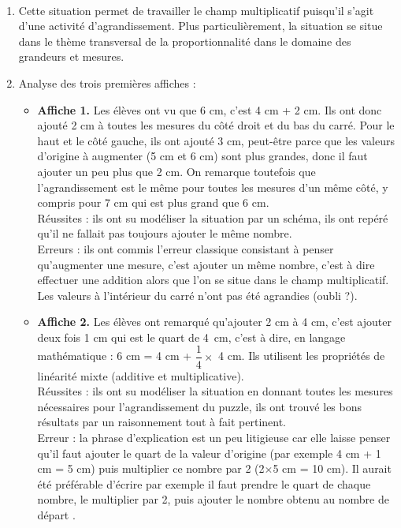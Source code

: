 \begin{corrige}
\ \\ [-5mm]
   \begin{enumerate}
      \item Cette situation permet de travailler le champ multiplicatif puisqu'il s'agit d'une activité d'agrandissement. Plus particulièrement, la situation se situe dans le thème transversal de la proportionnalité dans le domaine des grandeurs et mesures. 
      \item Analyse des trois premières affiches :
         \begin{itemize}
            \item {\bf Affiche 1.} Les élèves ont \og vu \fg{} que 6 cm, c'est 4 cm + 2 cm. Ils ont donc ajouté 2 cm à toutes les mesures du côté droit et du bas du carré. Pour le haut et le côté gauche, ils ont ajouté 3 cm, peut-être parce que les valeurs d'origine à augmenter (5 cm et 6 cm) sont plus grandes, donc il faut ajouter un peu plus que 2 cm. On remarque toutefois que l'agrandissement est le même pour toutes les mesures d'un même côté, y compris pour 7 cm qui est plus grand que 6 cm. \\
            Réussites : ils ont su modéliser la situation par un schéma, ils ont repéré qu'il ne fallait pas toujours ajouter le même nombre. \\
            Erreurs : ils ont commis l'erreur classique consistant à penser qu'augmenter une mesure, c'est ajouter un même nombre, c'est à dire effectuer une addition alors que l'on se situe dans le champ multiplicatif. Les valeurs à l'intérieur du carré n'ont pas été agrandies (oubli ?).
           \item {\bf Affiche 2.} Les élèves ont remarqué qu'ajouter 2 cm à 4 cm, c'est ajouter deux fois 1 cm qui est le quart de 4~cm, c'est à dire, en langage mathématique : 6 cm = 4 cm + $\dfrac14\times$ 4 cm. Ils utilisent les propriétés de linéarité mixte (additive et multiplicative). \\
           Réussites : ils ont su modéliser la situation en donnant toutes les mesures nécessaires pour l'agrandissement du puzzle, ils ont trouvé les bons résultats par un raisonnement tout à fait pertinent. \\
           Erreur : la phrase d'explication est un peu litigieuse car elle laisse penser qu'il faut ajouter le quart de la valeur d'origine (par exemple 4 cm + 1 cm = 5 cm) puis multiplier ce nombre par 2 (2$\times$5 cm = 10 cm). Il aurait été préférable d'écrire par exemple \og il faut prendre le quart de chaque nombre, le multiplier par 2, puis ajouter le nombre obtenu au nombre de départ \fg.

\end{itemize}
\end{enumerate}
\end{corrige}
